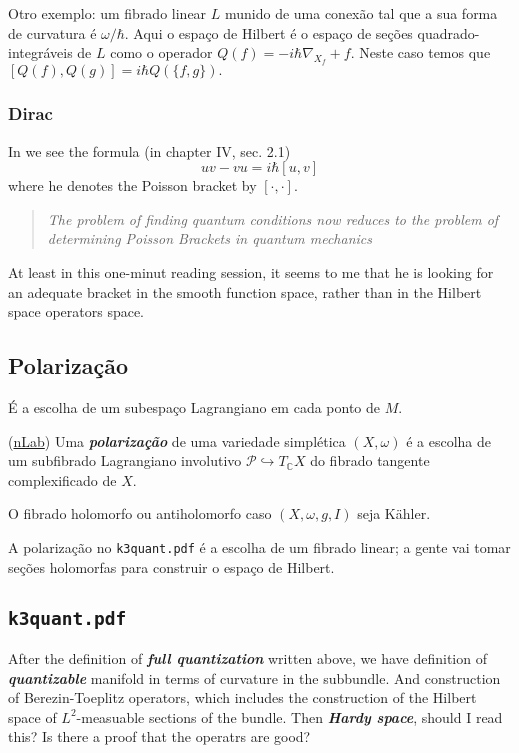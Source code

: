 Otro exemplo: um fibrado linear $L$ munido de uma conexão tal que a sua forma de curvatura é $ \omega /\hbar$. Aqui o espaço de Hilbert é o espaço de seções quadrado-integráveis de $L$ como o operador $Q(f)=-i\hbar \nabla_{X_f}+f$. Neste caso temos que $[Q(f),Q(g)]=i\hbar Q(\{f,g\}).$

\subsubsection{Dirac}

In \cite{dirac} we see the formula (in chapter IV, sec. 2.1)
\[uv-vu=i\hbar [u,v]\]
where he denotes the Poisson bracket by $[\cdot,\cdot ]$.
\begin{quotation}
	\textit{The problem of finding quantum conditions now reduces to the problem of determining Poisson Brackets in quantum mechanics} 
\end{quotation}
At least in this one-minut reading session, it seems to me that he is looking for an adequate bracket in the smooth function space, rather than in the Hilbert space operators space.


\subsection{Polarização}

É a escolha de um subespaço Lagrangiano em cada ponto de $M$.

\begin{defn}(\href{https://ncatlab.org/nlab/show/polarization#OfASymplecticManifold}{nLab})
	Uma \textit{\textbf{polarização}} de uma variedade simplética $(X,\omega )$ é a escolha de um subfibrado Lagrangiano involutivo $\mathcal{P}\hookrightarrow T_{\mathbb{C}}X$ do fibrado tangente complexificado de $X$.
\end{defn}

\begin{example}
	O fibrado holomorfo ou antiholomorfo caso $(X,\omega,g,I)$ seja K\"ahler.
\end{example}

A polarização no  \texttt{k3quant.pdf} é a escolha de um fibrado linear; a gente vai tomar seções holomorfas para construir o espaço de Hilbert.

\subsection{\texttt{k3quant.pdf}}

After the definition of \textit{\textbf{full quantization}} written above, we have definition of \textit{\textbf{quantizable}} manifold in terms of curvature in the subbundle. And construction of Berezin-Toeplitz operators, which includes the construction of the Hilbert space of $L^2$-measuable sections of the bundle. Then \textit{\textbf{Hardy space}}, should I read this? Is there a proof that the operatrs are good?

